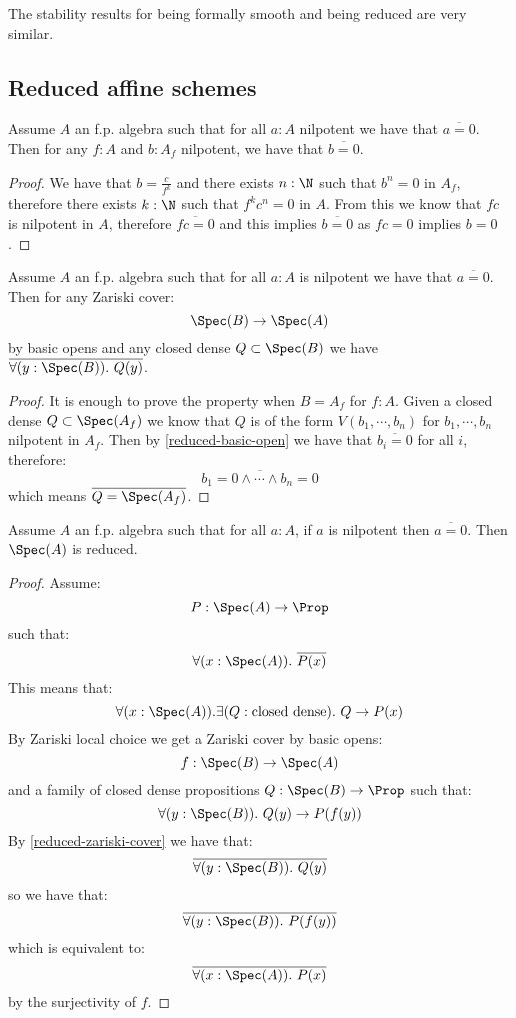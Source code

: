 \begin{remark}
The stability results for being formally smooth and being reduced are very similar.
\end{remark}

\subsection{Reduced affine schemes}

\begin{lemma}\label{reduced-basic-open}
Assume $A$ an f.p. algebra such that for all $a:A$ nilpotent we have that $\overline{a=0}$. Then for any $f:A$ and $b:A_f$ nilpotent, we have that $\overline{b=0}$.
\end{lemma}

\begin{proof}
We have that $b=\frac{c}{f^k}$ and there exists $n:\N$ such that $b^n=0$ in $A_f$, therefore there exists $k:\N$ such that $f^kc^n = 0$ in $A$. From this we know that $fc$ is nilpotent in $A$, therefore $\overline{fc=0}$ and this implies $\overline{b=0}$ as $fc=0$ implies $b=0$.
\end{proof}

\begin{lemma}\label{reduced-zariski-cover}
Assume $A$ an f.p. algebra such that for all $a:A$ is nilpotent we have that $\overline{a=0}$. Then for any Zariski cover:
\[\Spec(B)\to \Spec(A)\]
by basic opens and any closed dense $Q\subset \Spec(B)$ we have $\overline{\forall (y:\Spec(B)).\ Q(y)}$.
\end{lemma}

\begin{proof}
It is enough to prove the property when $B=A_f$ for $f:A$. Given a closed dense $Q\subset \Spec(A_f)$ we know that $Q$ is of the form $V(b_1,\cdots,b_n)$ for $b_1,\cdots,b_n$ nilpotent in $A_f$. Then by \cref{reduced-basic-open} we have that $\overline{b_i = 0}$ for all $i$, therefore:
\[\overline{b_1=0\land\cdots\land b_n=0}\] 
which means $\overline{Q=\Spec(A_f)}$.
\end{proof}

\begin{lemma}\label{ii-implies-i}
Assume $A$ an f.p. algebra such that for all $a:A$, if $a$ is nilpotent then $\overline{a=0}$. Then $\Spec(A)$ is reduced.
\end{lemma}

\begin{proof}
Assume:
\[P:\Spec(A)\to \Prop\]
such that:
\[\forall(x:\Spec(A)).\ \overline{P(x)}\]
This means that:
\[\forall(x:\Spec(A)).\exists (Q:\mathrm{closed\ dense}).\ Q \to P(x) \]
By Zariski local choice we get a Zariski cover by basic opens:
\[f:\Spec(B) \to \Spec(A)\]
and a family of closed dense propositions $Q:\Spec(B) \to \Prop$ such that:
\[\forall (y:\Spec(B)).\ Q(y) \to P(f(y))\]
By \cref{reduced-zariski-cover} we have that:
\[\overline{\forall (y:\Spec(B)).\ Q(y)}\]
so we have that:
\[\overline{\forall (y:\Spec(B)).\ P(f(y))}\]
which is equivalent to:
\[\overline{\forall (x:\Spec(A)).\ P(x)}\]
by the surjectivity of $f$.
\end{proof}

